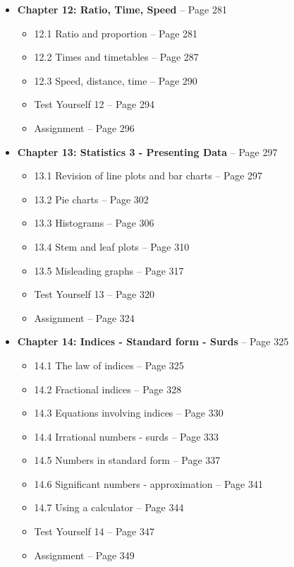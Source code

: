 \documentclass{article}
\begin{document}
\begin{itemize}
    \item \textbf{Chapter 12: Ratio, Time, Speed} -- Page 281
        \begin{itemize}
            \item 12.1 Ratio and proportion -- Page 281
            \item 12.2 Times and timetables -- Page 287
            \item 12.3 Speed, distance, time -- Page 290
            \item Test Yourself 12 -- Page 294
            \item Assignment -- Page 296
        \end{itemize}
    \item \textbf{Chapter 13: Statistics 3 - Presenting Data} -- Page 297
        \begin{itemize}
            \item 13.1 Revision of line plots and bar charts -- Page 297
            \item 13.2 Pie charts -- Page 302
            \item 13.3 Histograms -- Page 306
            \item 13.4 Stem and leaf plots -- Page 310
            \item 13.5 Misleading graphs -- Page 317
            \item Test Yourself 13 -- Page 320
            \item Assignment -- Page 324
        \end{itemize}
    \item \textbf{Chapter 14: Indices - Standard form - Surds} -- Page 325
        \begin{itemize}
            \item 14.1 The law of indices -- Page 325
            \item 14.2 Fractional indices -- Page 328
            \item 14.3 Equations involving indices -- Page 330
            \item 14.4 Irrational numbers - surds -- Page 333
            \item 14.5 Numbers in standard form -- Page 337
            \item 14.6 Significant numbers - approximation -- Page 341
            \item 14.7 Using a calculator -- Page 344
            \item Test Yourself 14 -- Page 347
            \item Assignment -- Page 349

\end{itemize}
\end{itemize}
\end{document}
